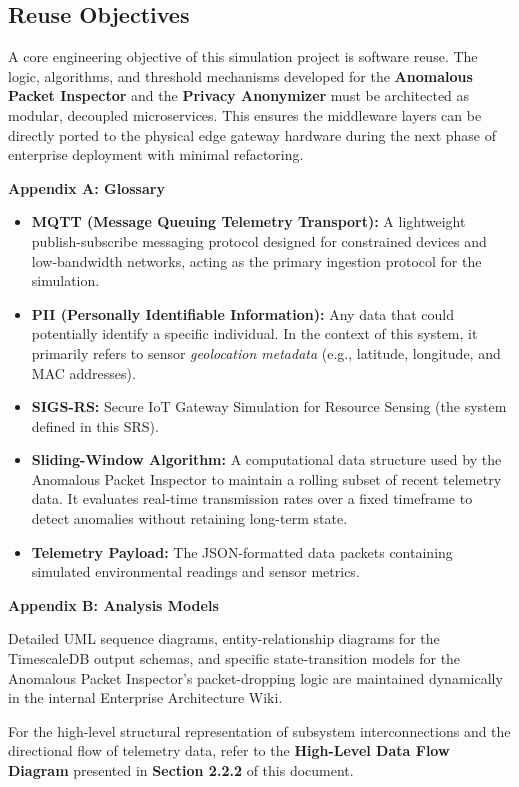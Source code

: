 \documentclass[12pt,letterpaper]{article}
\newcommand{\appendixheading}[1]{%
  \par\vspace{0.083in}%
  {\bfseries\fontsize{18}{20}\selectfont #1\par}%
  \vspace{0.167in}%
}
\begin{document}
\subsection{Reuse Objectives}
A core engineering objective of this simulation project is software reuse. The logic, algorithms, and threshold mechanisms developed for the \textbf{Anomalous Packet Inspector} and the \textbf{Privacy Anonymizer} must be architected as modular, decoupled microservices. This ensures the middleware layers can be directly ported to the physical edge gateway hardware during the next phase of enterprise deployment with minimal refactoring.

\appendixheading{Appendix A: Glossary}
\begin{itemize}
\item \textbf{MQTT (Message Queuing Telemetry Transport):} A lightweight publish-subscribe messaging protocol designed for constrained devices and low-bandwidth networks, acting as the primary ingestion protocol for the simulation.
\item \textbf{PII (Personally Identifiable Information):} Any data that could potentially identify a specific individual. In the context of this system, it primarily refers to sensor \emph{geolocation metadata} (e.g., latitude, longitude, and MAC addresses).
\item \textbf{SIGS-RS:} Secure IoT Gateway Simulation for Resource Sensing (the system defined in this SRS).
\item \textbf{Sliding-Window Algorithm:} A computational data structure used by the Anomalous Packet Inspector to maintain a rolling subset of recent telemetry data. It evaluates real-time transmission rates over a fixed timeframe to detect anomalies without retaining long-term state.
\item \textbf{Telemetry Payload:} The JSON-formatted data packets containing simulated environmental readings and sensor metrics.
\end{itemize}

\appendixheading{Appendix B: Analysis Models}
Detailed UML sequence diagrams, entity-relationship diagrams for the TimescaleDB output schemas, and specific state-transition models for the Anomalous Packet Inspector's packet-dropping logic are maintained dynamically in the internal Enterprise Architecture Wiki. 

For the high-level structural representation of subsystem interconnections and the directional flow of telemetry data, refer to the \textbf{High-Level Data Flow Diagram} presented in \textbf{Section 2.2.2} of this document.
\end{document}

